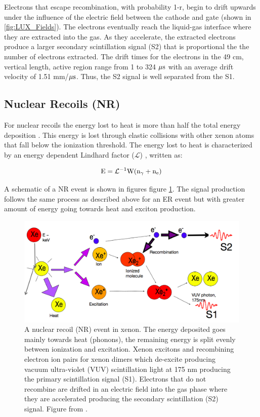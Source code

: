 Electrons that escape recombination, with probability 1-r, begin to drift upwards under the influence of the electric field between the cathode and gate (shown in \ref{fig:LUX_Fields}). The electrons eventually reach the liquid-gas interface where they are extracted into the gas. As they accelerate, the extracted electrons produce a larger secondary scintillation signal (S2) that is proportional the the number of electrons extracted. The drift times for the electrons in the 49 cm, vertical length, active region range from 1 to 324 $\rm \mu s$ with an average drift velocity of 1.51 mm/$\rm \mu s$. Thus, the S2 signal is well separated from the S1. 


\subsection{Nuclear Recoils (NR)}
For nuclear recoils the energy lost to heat is more than half the total energy deposition \cite{FanoTheoretical}. This energy is lost through elastic collisions with other xenon atoms that fall below the ionization threshold. The energy lost to heat is characterized by an energy dependent Lindhard factor ($\mathcal{L}$) \cite{Lindhard}, written as: 

\begin{equation}
\rm E=\mathcal{L}^{-1}W (n_\gamma + n_e)
\label{eq:Lindhard}
\end{equation}

A schematic of a NR event is shown in figures figure \ref{fig:TomS_NR}. The signal production follows the same process as described above for an ER event but with greater amount of energy going towards heat and exciton production. 

\renewcommand{\baselinestretch}{1}
\small\normalsize
 \begin{figure}[h!]\centering
\includegraphics[width=130mm]{Chapter_LUX_Det/NR_T_Shutt.png}
\caption{A nuclear recoil (NR) event in xenon. The energy deposited goes mainly towards heat (phonons), the remaining energy is split evenly between ionization and excitation. Xenon excitons and recombining electron ion pairs for xenon dimers which de-excite producing vacuum ultra-violet  (VUV) scintillation light at 175 nm producing the primary scintillation signal (S1). Electrons that do not recombine are drifted in an electric field into the gas phase where they are accelerated producing the secondary scintillation (S2) signal. Figure from \cite{T_Shutt}. }
\label{fig:TomS_NR}
\end{figure}
\renewcommand{\baselinestretch}{2}
\small\normalsize

